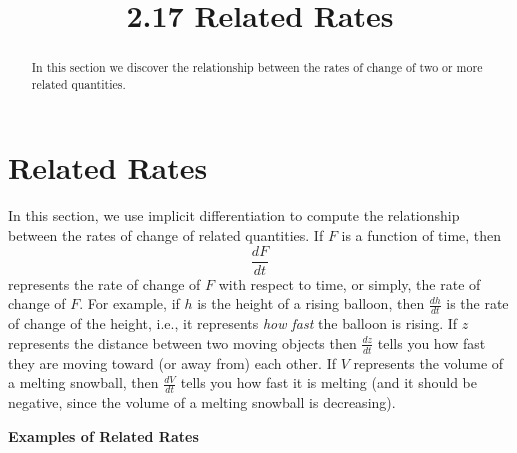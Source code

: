 \documentclass{ximera}
\title{2.17 Related Rates}
\begin{document}
\begin{abstract}
In this section we discover the relationship between the rates of change of two or more related quantities.
\end{abstract}

\maketitle


\section{Related Rates}

In this section, we use implicit differentiation to compute the relationship between 
the rates of change of related quantities.
If $F$ is a function of time, then 
\[ \frac{dF}{dt} \]
represents the rate of change of $F$ with respect to time, or simply, the rate of change of $F$.
For example, if $h$ is the height of a rising balloon, then $\frac{dh}{dt}$
is the rate of change of the height, i.e., it represents \textit{how fast}
the balloon is rising. If $z$ represents the distance between two moving 
objects then $\frac{dz}{dt}$ tells you how fast they are moving toward 
(or away from) each other.  If $V$ represents the volume of a melting snowball, 
then $\frac{dV}{dt}$ tells you how fast it is melting (and it should be negative, 
since the volume of a melting snowball is decreasing).


\begin{center}
\bf{Examples of Related Rates}
\end{center}
\end{document}
